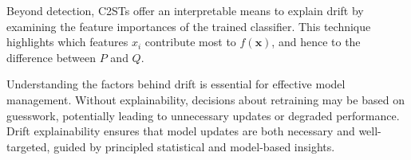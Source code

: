 Beyond detection, C2STs offer an interpretable means to explain drift by
examining the feature importances of the trained classifier. This technique
highlights which features $x_i$ contribute most to $f(\mathbf{x})$, and hence
to the difference between $P$ and $Q$.

Understanding the factors behind drift is essential for effective model
management. Without explainability, decisions about retraining may be based on
guesswork, potentially leading to unnecessary updates or degraded performance.
Drift explainability ensures that model updates are both necessary and
well-targeted, guided by principled statistical and model-based insights.